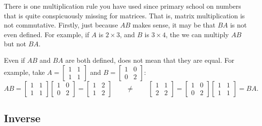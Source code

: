 There is one multiplication rule you have used since primary school on numbers
that is quite conspicuously missing for matrices.
That is, matrix multiplication is
not commutative.  Firstly, just because $AB$ makes sense, it may be
that $BA$ is not even defined.  For example, if $A$ is $2 \times 3$, and
$B$ is $3 \times 4$, the we can multiply $AB$ but not $BA$.

Even if $AB$ and $BA$ are both defined, does not mean that they are equal.
For example, take
$A = \left[ \begin{smallmatrix} 1 & 1 \\ 1 & 1 \end{smallmatrix} \right]$
and
$B = \left[ \begin{smallmatrix} 1 & 0 \\ 0 & 2 \end{smallmatrix} \right]$:
\begin{equation*}
AB = 
\begin{bmatrix} 1 & 1 \\ 1 & 1 \end{bmatrix}
\begin{bmatrix} 1 & 0 \\ 0 & 2 \end{bmatrix}
=
\begin{bmatrix} 1 & 2 \\ 1 & 2 \end{bmatrix}
\qquad
\not=
\qquad
\begin{bmatrix} 1 & 1 \\ 2 & 2 \end{bmatrix}
=
\begin{bmatrix} 1 & 0 \\ 0 & 2 \end{bmatrix}
\begin{bmatrix} 1 & 1 \\ 1 & 1 \end{bmatrix}
=
BA .
\end{equation*}

\subsection{Inverse}

